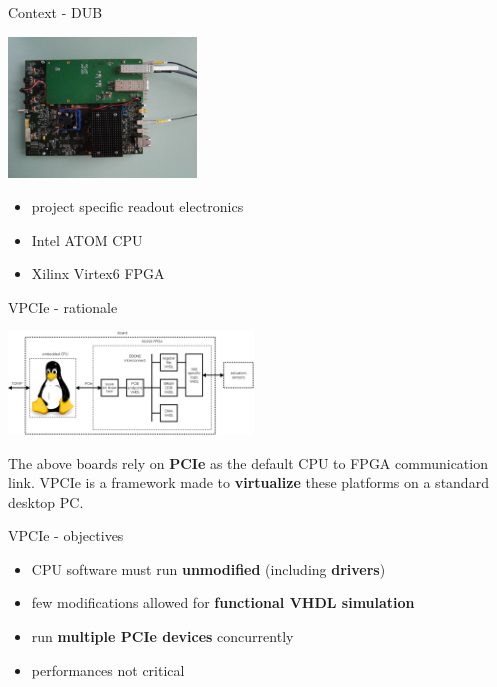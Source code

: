 \documentclass{beamer}
\begin{document}
\begin{frame}{Context - DUB}
  \begin{center}
    \includegraphics[width=50mm]{pic/dv_dub/main.jpg}
  \end{center}
  \begin{small}
  \begin{itemize}
  \item project specific readout electronics
  \item Intel ATOM CPU
  \item Xilinx Virtex6 FPGA
  \end{itemize}
  \end{small}
\end{frame}



\begin{frame}{VPCIe - rationale}
  \begin{center}
    \includegraphics[width=65mm]{pic/dv_generic_platform/main.jpeg}
  \end{center}
  \begin{small}
  The above boards rely on \textbf{PCIe} as the default CPU to FPGA
  communication link. VPCIe is a framework made to \textbf{virtualize}
  these platforms on a standard desktop PC.
  \end{small}
\end{frame}

\begin{frame}{VPCIe - objectives}
  \begin{itemize}
  \item CPU software must run \textbf{unmodified} (including \textbf{drivers})
  \item few modifications allowed for \textbf{functional VHDL simulation}
  \item run \textbf{multiple PCIe devices} concurrently
  \item performances not critical
  \end{itemize}
\end{frame}
\end{document}
